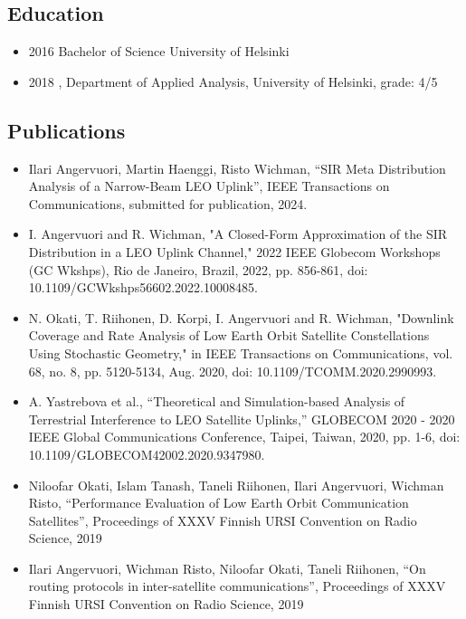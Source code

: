 \documentclass{article}
\begin{document}
        \subsection{Education}
        \begin{itemize}
        \item 2016 Bachelor of Science University of Helsinki\\
        \item 2018 , Department of Applied Analysis, University of Helsinki, grade: 4/5
          
        \end{itemize}

        
        
        \subsection{Publications}
        

        \begin{itemize}
        \item
          Ilari Angervuori,  Martin Haenggi, Risto Wichman, ``SIR Meta Distribution Analysis of a Narrow-Beam LEO Uplink'', IEEE Transactions on Communications, submitted for publication, 2024.
        \item
          I. Angervuori and R. Wichman, "A Closed-Form Approximation of the SIR Distribution in a LEO Uplink Channel," 2022 IEEE Globecom Workshops (GC Wkshps), Rio de Janeiro, Brazil, 2022, pp. 856-861, doi: 10.1109/GCWkshps56602.2022.10008485.
        \item
          N. Okati, T. Riihonen, D. Korpi, I. Angervuori and R. Wichman, "Downlink Coverage and Rate Analysis of Low Earth Orbit Satellite Constellations Using Stochastic Geometry," in IEEE Transactions on Communications, vol. 68, no. 8, pp. 5120-5134, Aug. 2020, doi: 10.1109/TCOMM.2020.2990993.
        \item A. Yastrebova et al., ``Theoretical and Simulation-based Analysis of Terrestrial Interference to LEO Satellite Uplinks,'' GLOBECOM 2020 - 2020 IEEE Global Communications Conference, Taipei, Taiwan, 2020, pp. 1-6, doi: 10.1109/GLOBECOM42002.2020.9347980.
        \item Niloofar Okati, Islam Tanash, Taneli Riihonen, Ilari Angervuori, Wichman Risto, ``Performance Evaluation of Low Earth Orbit Communication Satellites'', Proceedings of XXXV Finnish URSI Convention on Radio Science, 2019
        \item Ilari Angervuori, Wichman Risto, Niloofar Okati, Taneli Riihonen, ``On routing protocols in inter-satellite communications'', Proceedings of XXXV Finnish URSI Convention on Radio Science, 2019
          
        \end{itemize}
\end{document}
